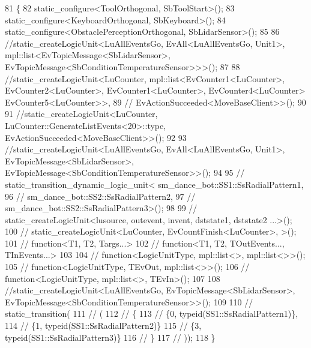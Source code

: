 \begin{DoxyCode}
81   \{
82     static\_configure<ToolOrthogonal, SbToolStart>();
83     static\_configure<KeyboardOrthogonal, SbKeyboard>();
84     static\_configure<ObstaclePerceptionOrthogonal, SbLidarSensor>();
85 
86     \textcolor{comment}{//static\_createLogicUnit<LuAllEventsGo, EvAll<LuAllEventsGo, Unit1>,
       mpl::list<EvTopicMessage<SbLidarSensor>, EvTopicMessage<SbConditionTemperatureSensor>>>();}
87 
88     \textcolor{comment}{//static\_createLogicUnit<LuCounter, mpl::list<EvCounter1<LuCounter>, EvCounter2<LuCounter>,
       EvCounter1<LuCounter>, EvCounter4<LuCounter> EvCounter5<LuCounter>>,}
89     \textcolor{comment}{//                       EvActionSucceeded<MoveBaseClient>>();}
90 
91     \textcolor{comment}{//static\_createLogicUnit<LuCounter, LuCounter::GenerateListEvents<20>::type,
       EvActionSucceeded<MoveBaseClient>>();}
92 
93     \textcolor{comment}{//static\_createLogicUnit<LuAllEventsGo, EvAll<LuAllEventsGo, Unit1>,          
       EvTopicMessage<SbLidarSensor>, EvTopicMessage<SbConditionTemperatureSensor>>();}
94 
95     \textcolor{comment}{// static\_transition\_dynamic\_logic\_unit< sm\_dance\_bot::SS1::SsRadialPattern1,}
96     \textcolor{comment}{//                                       sm\_dance\_bot::SS2::SsRadialPattern2,}
97     \textcolor{comment}{//                                       sm\_dance\_bot::SS2::SsRadialPattern3>();}
98 
99     \textcolor{comment}{// static\_createLogicUnit<lusource, outevent, invent, dststate1, dststate2 ...>();}
100     \textcolor{comment}{// static\_createLogicUnit<LuCounter, EvCountFinish<LuCounter>,    >();}
101     \textcolor{comment}{// function<T1, T2, Targs...>}
102     \textcolor{comment}{// function<T1, T2, TOutEvents..., TInEvents...>}
103 
104     \textcolor{comment}{// function<LogicUnitType, mpl::list<>, mpl::list<>>();}
105     \textcolor{comment}{// function<LogicUnitType, TEvOut, mpl::list<>>();}
106     \textcolor{comment}{// function<LogicUnitType, mpl::list<>, TEvIn>();}
107 
108     \textcolor{comment}{//static\_createLogicUnit<LuAllEventsGo,  EvTopicMessage<SbLidarSensor>,
       EvTopicMessage<SbConditionTemperatureSensor>>();}
109 
110     \textcolor{comment}{// static\_transition(}
111     \textcolor{comment}{// (}
112     \textcolor{comment}{//   \{}
113     \textcolor{comment}{//     \{0, typeid(SS1::SsRadialPattern1)\},}
114     \textcolor{comment}{//     \{1, typeid(SS1::SsRadialPattern2)\}}
115     \textcolor{comment}{//     \{3, typeid(SS1::SsRadialPattern3)\}}
116     \textcolor{comment}{//   \}}
117     \textcolor{comment}{// ));}
118   \}
\end{DoxyCode}
